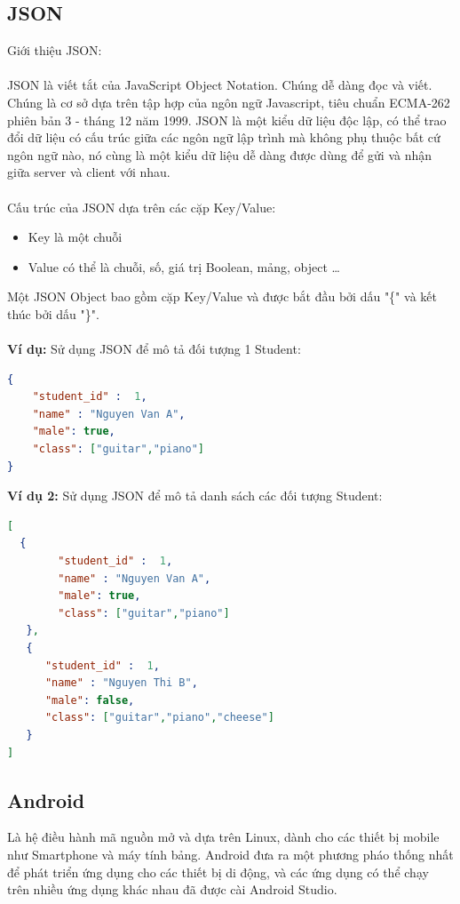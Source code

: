 \documentclass[a4paper]{article}
\begin{document}
\subsection{JSON}
Giới thiệu JSON:\\
\\
JSON là viết tắt của JavaScript Object Notation. Chúng dễ dàng đọc và viết. Chúng là cơ sở dựa trên tập hợp của ngôn ngữ Javascript, tiêu chuẩn  ECMA-262 phiên bản 3 - tháng 12 năm 1999. JSON là một kiểu dữ liệu độc lập, có thể  trao đổi dữ liệu có cấu trúc giữa các ngôn ngữ lập trình mà không phụ thuộc bất cứ ngôn ngữ nào, nó cùng là một kiểu dữ liệu dễ dàng được dùng để gửi và nhận  giữa server và client với nhau.\\
\\
Cấu trúc của JSON dựa trên các cặp Key/Value:
\begin{itemize}
    \item Key là một chuỗi
    \item Value có thể là chuỗi, số, giá trị Boolean, mảng, object …
\end{itemize}
Một JSON Object bao gồm cặp Key/Value và được bắt đầu bởi dấu "\{" và kết thúc bởi dấu "\}".\\
\\
\textbf{Ví dụ:} Sử dụng JSON để mô tả đối tượng 1 Student:
\begin{lstlisting}[language=json,firstnumber=1]
{
	"student_id" :  1,
	"name" : "Nguyen Van A",
	"male": true,
	"class": ["guitar","piano"]
}
\end{lstlisting}
\textbf{Ví dụ 2:} Sử dụng JSON để mô tả danh sách các đối tượng Student:
\begin{lstlisting}[language=json,firstnumber=1]
[
  {
    	"student_id" :  1,
    	"name" : "Nguyen Van A",
    	"male": true,
    	"class": ["guitar","piano"]
   },
   {
      "student_id" :  1,
      "name" : "Nguyen Thi B",
      "male": false,
      "class": ["guitar","piano","cheese"]
   }
]
\end{lstlisting}
\subsection{Android}
Là hệ điều hành mã nguồn mở và dựa trên Linux, dành cho các thiết bị mobile như Smartphone và máy tính bảng. Android đưa ra một phương pháo thống nhất để phát triển ứng dụng cho các thiết bị di động, và các ứng dụng có thể chạy trên nhiều ứng dụng khác nhau đã được cài Android Studio.
\end{document}
